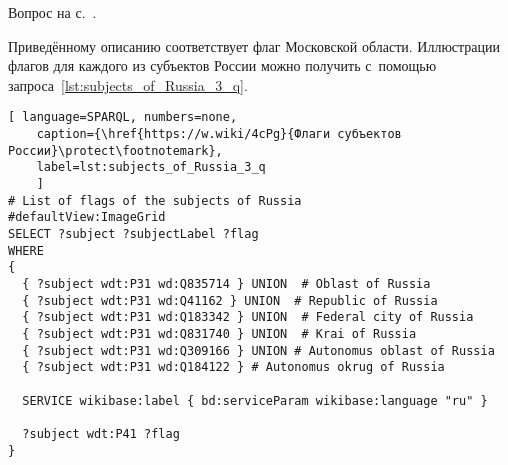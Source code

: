 \begin{task}
\label{answer:subjects_of_Russia_3}
    \AnswerBackref Вопрос на с.~\pageref{lst:oblast-of-Russia}.

    Приведённому описанию соответствует флаг Московской области. 
    Иллюстрации флагов для каждого из субъектов России 
    можно получить с~помощью запроса~\ref{lst:subjects_of_Russia_3_q}.
	
	\begin{lstlisting}[ language=SPARQL, numbers=none,
	caption={\href{https://w.wiki/4cPg}{Флаги субъектов России}\protect\footnotemark},
	label=lst:subjects_of_Russia_3_q
	]
# List of flags of the subjects of Russia
#defaultView:ImageGrid
SELECT ?subject ?subjectLabel ?flag
WHERE
{
  { ?subject wdt:P31 wd:Q835714 } UNION  # Oblast of Russia
  { ?subject wdt:P31 wd:Q41162 } UNION  # Republic of Russia
  { ?subject wdt:P31 wd:Q183342 } UNION  # Federal city of Russia
  { ?subject wdt:P31 wd:Q831740 } UNION  # Krai of Russia
  { ?subject wdt:P31 wd:Q309166 } UNION # Autonomus oblast of Russia
  { ?subject wdt:P31 wd:Q184122 } # Autonomus okrug of Russia
  
  SERVICE wikibase:label { bd:serviceParam wikibase:language "ru" }
   
  ?subject wdt:P41 ?flag
}
\end{lstlisting}
\end{task}



